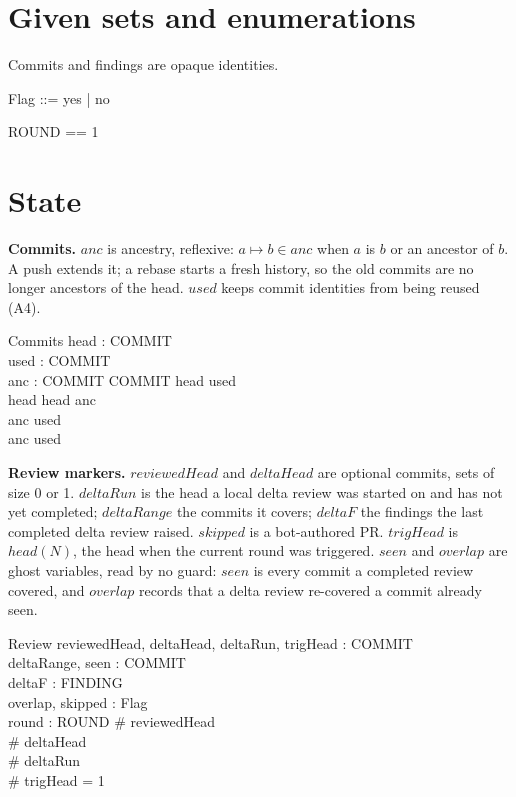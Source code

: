\documentclass{article}
\begin{document}
\section{Given sets and enumerations}

Commits and findings are opaque identities.

\begin{zed}
\end{zed}

\begin{zed}
  Flag ::= yes | no
\end{zed}

\begin{zed}
  ROUND == 1 
\end{zed}

\section{State}

\textbf{Commits.} $anc$ is ancestry, reflexive: $a \mapsto b \in anc$ when $a$
is $b$ or an ancestor of $b$. A push extends it; a rebase starts a fresh
history, so the old commits are no longer ancestors of the head. $used$ keeps
commit identities from being reused (A4).

\begin{schema}{Commits}
  head : COMMIT \\
  used : \power COMMIT \\
  anc : COMMIT \rel COMMIT
\where
  head \in used \\
  head \mapsto head \in anc \\
  \dom anc \subseteq used \\
  \ran anc \subseteq used
\end{schema}

\textbf{Review markers.} $reviewedHead$ and $deltaHead$ are optional commits,
sets of size 0 or 1. $deltaRun$ is the head a local delta review was started
on and has not yet completed; $deltaRange$ the commits it covers; $deltaF$ the
findings the last completed delta review raised. $skipped$ is a bot-authored
PR. $trigHead$ is $head(N)$, the head when the current round was triggered.
$seen$ and $overlap$ are ghost variables, read by no guard: $seen$ is every
commit a completed review covered, and $overlap$ records that a delta review
re-covered a commit already seen.

\begin{schema}{Review}
  reviewedHead, deltaHead, deltaRun, trigHead : \power COMMIT \\
  deltaRange, seen : \power COMMIT \\
  deltaF : \power FINDING \\
  overlap, skipped : Flag \\
  round : ROUND
\where
  \# reviewedHead  \\
  \# deltaHead  \\
  \# deltaRun  \\
  \# trigHead = 1
\end{schema}
\end{document}
